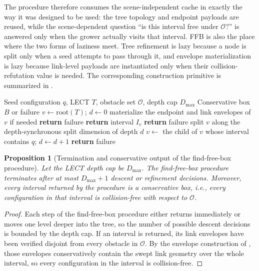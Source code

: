 \documentclass[journal]{IEEEtran}
\DeclareRobustCommand{\textsc}[1]{\textnormal{\MakeUppercase{#1}}}
\newtheorem{proposition}{Proposition}
\newcommand{\calO}{\ensuremath{\mathcal{O}}}
\begin{document}
The procedure therefore consumes the scene-independent cache in exactly the way
it was designed to be used: the tree topology and endpoint payloads are reused,
while the scene-dependent question ``is this interval free under $\calO$?'' is
answered only when the grower actually visits that interval. FFB is also the
place where the two forms of laziness meet. Tree refinement is lazy because a
node is split only when a seed attempts to pass through it, and envelope
materialization is lazy because link-level payloads are instantiated only when
their collision-refutation value is needed. The corresponding construction
primitive is summarized in .

\begin{algorithm}[t]
\caption{\textsc{FindFreeBox}---retrieve a validated conservative joint box from LECT}
\label{alg:ffb_rewrite}
\footnotesize
\begin{algorithmic}[1]
\REQUIRE Seed configuration $q$, LECT $T$, obstacle set $\calO$, depth cap $D_{\max}$
\ENSURE Conservative box $B$ or failure
\STATE $v \gets \mathrm{root}(T)$; $d \gets 0$
  \STATE materialize the endpoint and link envelopes of $v$ if needed
    \STATE \textbf{return} failure
  \ENDIF
  \IF{$v$ is validated collision-free with respect to $\calO$}
    \STATE \textbf{return} interval $I_v$
  \ENDIF
    \STATE \textbf{return} failure
  \ENDIF
    \STATE split $v$ along the depth-synchronous split dimension of depth $d$
  \ENDIF
  \STATE $v \gets$ the child of $v$ whose interval contains $q$; $d \gets d+1$
\ENDWHILE
\STATE \textbf{return} failure
\end{algorithmic}
\end{algorithm}

\begin{proposition}[Termination and conservative output of the find-free-box procedure]
\label{prop:ffb_rewrite}
Let the LECT depth cap be $D_{\max}$. The find-free-box procedure terminates
after at most $D_{\max}+1$ descent or refinement decisions. Moreover, every
interval returned by the procedure is a conservative box, i.e., every
configuration in that interval is collision-free with respect to $\calO$.
\end{proposition}

\begin{proof}
Each step of the find-free-box procedure either returns immediately or moves
one level deeper into the tree, so the number of possible descent decisions
is bounded by the depth cap. If an interval is returned, its link envelopes
have been verified disjoint from every obstacle in $\calO$. By the envelope
construction of , those envelopes conservatively
contain the swept link geometry over the whole interval, so every configuration
in the interval is collision-free.
\end{proof}
\end{document}
